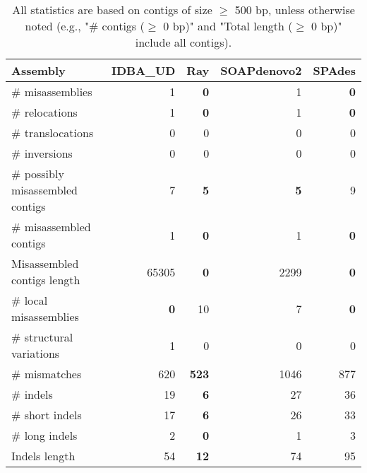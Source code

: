 \documentclass[12pt,a4paper]{article}
\begin{document}
\begin{table}[ht]
\begin{center}
\caption{All statistics are based on contigs of size $\geq$ 500 bp, unless otherwise noted (e.g., "\# contigs ($\geq$ 0 bp)" and "Total length ($\geq$ 0 bp)" include all contigs).}
\begin{tabular}{|l*{4}{|r}|}
\hline
Assembly & IDBA\_UD & Ray & SOAPdenovo2 & SPAdes \\ \hline
\# misassemblies & 1 & {\bf 0} & 1 & {\bf 0} \\ \hline
\hspace{5mm}\# relocations & 1 & {\bf 0} & 1 & {\bf 0} \\ \hline
\hspace{5mm}\# translocations & 0 & 0 & 0 & 0 \\ \hline
\hspace{5mm}\# inversions & 0 & 0 & 0 & 0 \\ \hline
\# possibly misassembled contigs & 7 & {\bf 5} & {\bf 5} & 9 \\ \hline
\# misassembled contigs & 1 & {\bf 0} & 1 & {\bf 0} \\ \hline
Misassembled contigs length & 65305 & {\bf 0} & 2299 & {\bf 0} \\ \hline
\# local misassemblies & {\bf 0} & 10 & 7 & {\bf 0} \\ \hline
\# structural variations & 1 & 0 & 0 & 0 \\ \hline
\# mismatches & 620 & {\bf 523} & 1046 & 877 \\ \hline
\# indels & 19 & {\bf 6} & 27 & 36 \\ \hline
\hspace{5mm}\# short indels & 17 & {\bf 6} & 26 & 33 \\ \hline
\hspace{5mm}\# long indels & 2 & {\bf 0} & 1 & 3 \\ \hline
Indels length & 54 & {\bf 12} & 74 & 95 \\ \hline
\end{tabular}
\end{center}
\end{table}
\end{document}
